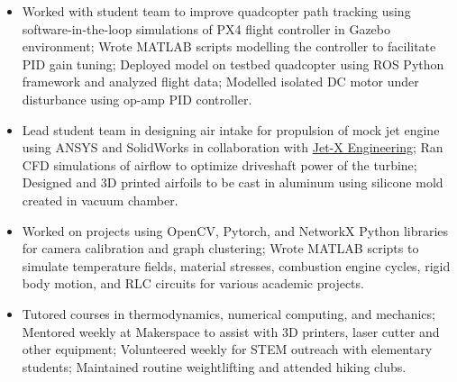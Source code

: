\documentclass[11pt,a4paper,sans]{moderncv}
\begin{document}
{\begin{itemize}[leftmargin=0.5cm, label={\textbullet}]

\item Worked with student team to improve quadcopter path tracking using software-in-the-loop simulations of PX4 flight controller in Gazebo environment; Wrote MATLAB scripts modelling the controller to facilitate PID gain tuning; Deployed model on testbed quadcopter using ROS Python framework and analyzed flight data; Modelled isolated DC motor under disturbance using op-amp PID controller.

\item Lead student team in designing air intake for propulsion of mock jet engine using ANSYS and SolidWorks in collaboration with {{\color{blue}\href{https://www.jet-x.org/about.html}{Jet-X Engineering}}}; Ran CFD simulations of airflow to optimize driveshaft power of the turbine; Designed and 3D printed airfoils to be cast in aluminum using silicone mold created in vacuum chamber.

\item Worked on projects using OpenCV, Pytorch, and NetworkX Python libraries for camera calibration and graph clustering; Wrote MATLAB scripts to simulate temperature fields, material stresses, combustion engine cycles, rigid body motion, and RLC circuits for various academic projects. 

\item Tutored courses in thermodynamics, numerical computing, and mechanics; Mentored weekly at Makerspace to assist with 3D printers, laser cutter and other equipment; Volunteered weekly for STEM outreach with elementary students; Maintained routine weightlifting and attended hiking clubs.

\end{itemize}} 
\end{document}
